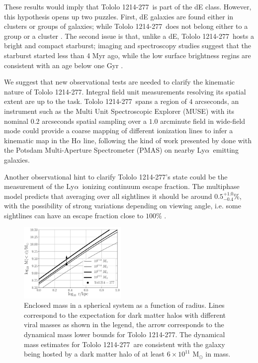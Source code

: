 \documentclass[a4,useAMS,usenatbib,usegraphicx]{mn2e}
\newcommand{\tol}{Tololo 1214-277}
\newcommand{\lya}{\ifmmode{{\rm Ly}\alpha}\else Ly$\alpha$\ \fi}
\begin{document}
These results would imply that \tol\ is part of the dE
class. 
However, this hypothesis opens up two puzzles.
First, dE galaxies are found either in clusters or groups of
galaxies; while \tol\ does not belong either to a group or a cluster
\citep{2001AJ....121..169F}. 
The second issue is that, unlike a dE, \tol\ hosts a bright and compact
starburst; imaging and spectroscopy studies suggest that the
starburst started less than 4 Myr ago, while the low surface
brightness regins are consistent with an age below one Gyr
\citep{2001AJ....121..169F}.

We suggest that new observational tests are needed to clarify the
kinematic nature of \tol.
Integral field unit measurements resolving its spatial extent are up
to the task.  
\tol\ spans a region of $4$ arcseconds,
an instrument such as the Multi Unit Spectroscopic Explorer (MUSE)
\citep{2014Msngr.157...13B} with its nominal $0.2$ arcseconds spatial
sampling over a $1.0$ arcminute field in wide-field mode could provide
a coarse mapping of different ionization lines to infer a kinematic
map in the H$\alpha$ line, following the kind of work presented by
\citet{Herenz16} done with the Potsdam Multi-Aperture Spectrometer
(PMAS) \citep{PMAS} on nearby \lya emitting galaxies. 

Another observational hint to clarify \tol's state could be
the measurement of the \lya ionizing continuum escape fraction. 
The multiphase model predicts that averaging over all sightlines
it should be around $0.5^{+1.0}_{-0.4}$\%, with the possibility of strong
variations depending on viewing angle, i.e. some sightlines can have
an escape fraction close to $100\%$ \citep{Gronke2016}. 


\begin{figure}
\begin{center}
\includegraphics[width=0.46\textwidth]{enclosed_mass.pdf}
\caption{Enclosed mass in a spherical system as a function of radius.
  Lines correspond to the expectation for dark matter halos with
  different viral masses as shown in the legend, the arrow corresponds
  to the dynamical mass lower bounds for \tol.  
  The dynamical mass estimates for \tol\ are consistent with the
  galaxy being hosted by a dark matter halo of at least
  $6\times10^{11}$ M$_{\odot}$ in mass.
    \label{fig:mass}} 
\end{center}
\end{figure}
\end{document}
